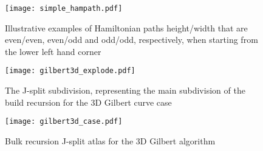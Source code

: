 \begin{figure}[h]
  \centering
  \texttt{[image: simple\_hampath.pdf]}
  \caption{ Illustrative examples of Hamiltonian paths height/width that are even/even, even/odd and odd/odd, respectively,
            when starting from the lower left hand corner }
  \label{fig:exampleHampath}
\end{figure}


\begin{figure}[h]
  \centering
  \texttt{[image: gilbert3d\_explode.pdf]}
  \caption{ The J-split subdivision, representing the main subdivision of the build recursion for the 3D Gilbert curve case }
  \label{fig:gilbert3DJSplit}
\end{figure}


\begin{figure*}[ht]
  \centering
  \texttt{[image: gilbert3d\_case.pdf]}
  \caption{ Bulk recursion J-split atlas for the 3D Gilbert algorithm }
  \label{fig:gilbert3DCase}
\end{figure*}



